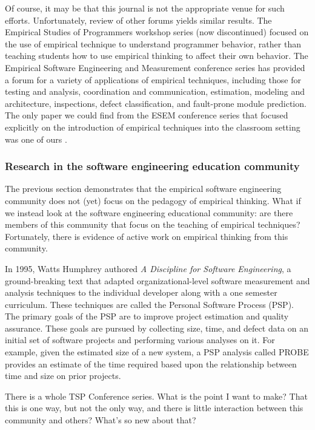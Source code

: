 Of course, it may be that this journal is not the appropriate venue for
such efforts.  Unfortunately, review of other forums yields similar
results.  The Empirical Studies of Programmers workshop series (now
discontinued) focused on the use of empirical technique to understand
programmer behavior, rather than teaching students how to use empirical
thinking to affect their own behavior.  The Empirical Software Engineering
and Measurement conference series has provided a forum for a variety of
applications of empirical techniques, including those for testing and
analysis, coordination and communication, estimation, modeling and
architecture, inspections, defect classification, and fault-prone module
prediction.  The only paper we could find from the ESEM conference series
that focused explicitly on the introduction of empirical techniques into
the classroom setting was one of ours \citep{csdl2-03-12}.

\subsubsection{Research in the software engineering education community}

The previous section demonstrates that the empirical software engineering
community does not (yet) focus on the pedagogy of empirical thinking.  What
if we instead look at the software engineering educational community: are
there members of this community that focus on the teaching of empirical
techniques?  Fortunately, there is evidence of active work on empirical
thinking from this community.

In 1995, Watts Humphrey authored {\em A Discipline for Software
Engineering}, a ground-breaking text that adapted organizational-level
software measurement and analysis techniques to the individual developer
along with a one semester curriculum. These techniques are called the
Personal Software Process (PSP).  The primary goals of the PSP are to
improve project estimation and quality assurance.  These goals are pursued
by collecting size, time, and defect data on an initial set of software
projects and performing various analyses on it. For example, given the
estimated size of a new system, a PSP analysis called PROBE provides an
estimate of the time required based upon the relationship between time and
size on prior projects.

There is a whole TSP Conference series. What is the point I want to make? That this is one way, but not the only way, and there is little interaction between this community and others?  What's so new about that? 




